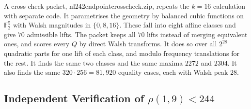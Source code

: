 \documentclass[11pt]{article}
\theoremstyle{definition}
\newcommand{\F}{\mathbb{F}}
\newcommand{\code}[1]{{\ttfamily\small\renewcommand{\_}{\textunderscore\allowbreak}#1}}
\begin{document}
A cross-check packet, \code{nl242\_endpoint\_crosscheck.zip}, repeats the $k=16$ calculation with separate code. It parametrises the geometry by balanced cubic functions on $\F_2^5$ with Walsh magnitudes in $\{0,8,16\}$. These fall into eight affine classes and give $70$ admissible lifts. The packet keeps all $70$ lifts instead of merging equivalent ones, and scores every $Q$ by direct Walsh transforms. It does so over all $2^{28}$ quadratic parts for one lift of each class, and modulo frequency translations for the rest. It finds the same two classes and the same maxima $2272$ and $2304$. It also finds the same $320\cdot256=81{,}920$ equality cases, each with Walsh peak $28$.

\subsection{Independent Verification of $\rho(1,9) < 244$}
\label{sec:nl244}
\end{document}

